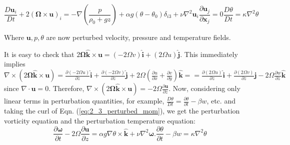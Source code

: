 \documentclass{article}
\begin{document}
\begin{subequations} \label{eq:2_3_perturbed}
 \begin{equation}\label{eq:2_3_perturbed_mom}
  \frac{D\boldsymbol{u}_{i}}{Dt} + 2 (\boldsymbol{\Omega} \times \boldsymbol{u})_{i} = -\nabla \left(\frac{p}{\rho_{0} + gz}\right) + \alpha g (\theta - \theta_{0}) \delta_{i3} + \nu \nabla^{2} \boldsymbol{u}_{i}
 \end{equation}
 \begin{equation}
  \frac{\partial \boldsymbol{u}_{j}}{\partial \boldsymbol{x}_{j}} = 0
 \end{equation}
 \begin{equation}
  \frac{D\theta}{Dt} = \kappa \nabla^{2} \theta
 \end{equation}
\end{subequations}

Where $\boldsymbol{u}, p, \theta$ are now perturbed velocity, pressure and temperature fields. 

It is easy to check that $2\boldsymbol{\Omega \hat{k}} \times \boldsymbol{u} =  (-2\Omega v)\boldsymbol{\hat{i}} + (2\Omega u)\boldsymbol{\hat{j}}$. This immediately implies  $\nabla \times (2\boldsymbol{\Omega \hat{k}} \times \boldsymbol{u}) = \frac{\partial (-2\Omega u)}{\partial z} \boldsymbol{\hat{i}} + \frac{\partial (-2\Omega v)}{\partial z} \boldsymbol{\hat{j}}  + 2\Omega\left(\frac{\partial u}{\partial x} + \frac{\partial v}{\partial y}\right) \boldsymbol{\hat{k}} = = \frac{\partial (2\Omega u)}{\partial z} \boldsymbol{\hat{i}} + \frac{\partial (2\Omega v)}{\partial z} \boldsymbol{\hat{j}}  - 2\Omega\frac{\partial w}{\partial z} \boldsymbol{\hat{k}}$ since $\nabla \cdot \boldsymbol{u} = 0$. Therefore, $\nabla \times (2\boldsymbol{\Omega \hat{k}} \times \boldsymbol{u}) = -2\Omega \frac{\partial \boldsymbol{u}}{\partial z}$. Now, considering only linear terms in perturbation quantities, for example,
$\frac{D\theta}{Dt} = \frac{\partial \theta}{\partial t} - \beta w$, etc. and taking the curl of Eqn. (\ref{eq:2_3_perturbed_mom}), we get the perturbation vorticity equation and the perturbation temperature equation:
\begin{subequations}
 \begin{equation}\label{eq:2_3_perturbed_vorticity}
\frac{\partial \boldsymbol{\omega}}{\partial t} - 2\Omega\frac{\partial \boldsymbol{u}}{\partial {z}} = \alpha g \nabla \theta \times \boldsymbol{\hat{k}} + \nu \nabla^{2} \boldsymbol{\omega}.  
 \end{equation}
 \begin{equation} \label{eq:2_3_perturbed_energy}
  \frac{\partial \theta}{\partial t} - \beta w = \kappa \nabla^{2} \theta
 \end{equation}
\end{subequations}
\end{document}
